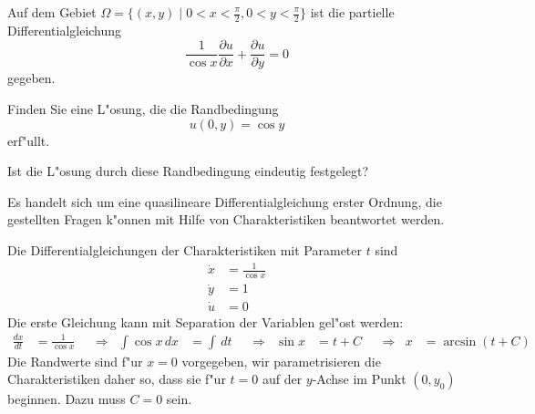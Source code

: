 Auf dem Gebiet $\Omega=\{(x,y)\;|\;0<x<\frac{\pi}2,0<y<\frac{\pi}{2}\}$
ist die partielle Differentialgleichung
\begin{equation}
\frac{1}{\cos x}\frac{\partial u}{\partial x}+\frac{\partial u}{\partial y}=0
\label{30000010:gleichung}
\end{equation}
gegeben.
\begin{teilaufgaben}
\item Finden Sie eine L"osung, die die Randbedingung
\[
u(0,y)=\cos y
\]
erf"ullt.
\item Ist die L"osung durch diese Randbedingung eindeutig festgelegt?
\end{teilaufgaben}

\begin{loesung}
Es handelt sich um eine quasilineare Differentialgleichung erster Ordnung,
die gestellten Fragen k"onnen mit Hilfe von Charakteristiken beantwortet
werden.
\begin{teilaufgaben}
\item
Die Differentialgleichungen der Charakteristiken mit Parameter $t$
sind
\begin{align}
\dot x &= \frac1{\cos x}\label{30000010:1}\\
\dot y &= 1\label{30000010:2}\\
\dot u &= 0\label{30000010:3}
\end{align}
Die erste Gleichung kann mit Separation der Variablen gel"ost werden:
\begin{align*}
\frac{dx}{dt}&=\frac1{\cos x}
&&\Rightarrow&
\int \cos x\,dx&=\int\, dt
&&\Rightarrow&
\sin x&=t + C
&&\Rightarrow&
x&=\arcsin(t + C)
\end{align*}
Die Randwerte sind f"ur $x=0$ vorgegeben, wir parametrisieren die
Charakteristiken daher so, dass sie f"ur $t=0$ auf der $y$-Achse
im Punkt $(0,y_0)$ beginnen. Dazu muss $C=0$ sein.


\end{teilaufgaben}
\end{loesung}
